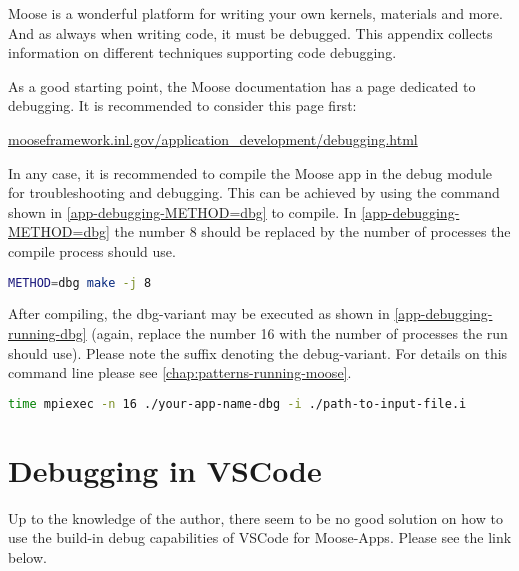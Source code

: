 Moose is a wonderful platform for writing your own kernels, materials and more.
And as always when writing code, it must be debugged. This appendix collects
information on different techniques supporting code debugging.

As a good starting point, the Moose documentation has a page dedicated to
debugging. It is recommended to consider this page first:

\href{https://mooseframework.inl.gov/application_development/debugging.html}{mooseframework.inl.gov/application\_development/debugging.html}

In any case, it is recommended to compile the Moose app in the debug module for
troubleshooting and debugging. This can be achieved by using the command shown
in \autoref{app-debugging-METHOD=dbg} to compile. In
\autoref{app-debugging-METHOD=dbg} the number 8 should be replaced by the
number of processes the compile process should use.

\begin{lstlisting}[language=bash, caption={Compile in dbg-mode},label={app-debugging-METHOD=dbg}]
METHOD=dbg make -j 8
\end{lstlisting}

After compiling, the dbg-variant may be executed as shown in
\autoref{app-debugging-running-dbg} (again, replace the number 16 with the
number of processes the run should use). Please note the suffix 
denoting the debug-variant. For details on this command line please see
\autoref{chap:patterns-running-moose}.

\begin{lstlisting}[language=bash, caption={Executing the dbg-variant of a moose-app},label={app-debugging-running-dbg}]
time mpiexec -n 16 ./your-app-name-dbg -i ./path-to-input-file.i
\end{lstlisting}


\section{Debugging in VSCode}

Up to the knowledge of the author, there seem to be no good solution on how to
use the build-in debug capabilities of VSCode for Moose-Apps. Please see the
link below.

